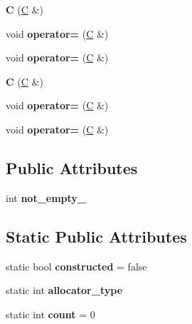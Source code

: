 \begin{DoxyCompactItemize}
\item 
\mbox{\label{struct_c_af685fe0d514aa5b57dd12b2038ce825e}} 
{\bfseries C} (\mbox{\hyperlink{struct_c}{C}} \&)
\item 
\mbox{\label{struct_c_a0e102e04676b8089288d6a09e93932fc}} 
void {\bfseries operator=} (\mbox{\hyperlink{struct_c}{C}} \&)
\item 
\mbox{\label{struct_c_a0e102e04676b8089288d6a09e93932fc}} 
void {\bfseries operator=} (\mbox{\hyperlink{struct_c}{C}} \&)
\item 
\mbox{\label{struct_c_af685fe0d514aa5b57dd12b2038ce825e}} 
{\bfseries C} (\mbox{\hyperlink{struct_c}{C}} \&)
\item 
\mbox{\label{struct_c_a0e102e04676b8089288d6a09e93932fc}} 
void {\bfseries operator=} (\mbox{\hyperlink{struct_c}{C}} \&)
\item 
\mbox{\label{struct_c_a0e102e04676b8089288d6a09e93932fc}} 
void {\bfseries operator=} (\mbox{\hyperlink{struct_c}{C}} \&)
\end{DoxyCompactItemize}
\subsection*{Public Attributes}
\begin{DoxyCompactItemize}
\item 
\mbox{\label{struct_c_aa9e10df72ec42809314914d1b36148d1}} 
int {\bfseries not\+\_\+empty\+\_\+}
\end{DoxyCompactItemize}
\subsection*{Static Public Attributes}
\begin{DoxyCompactItemize}
\item 
\mbox{\label{struct_c_ae24a85e80c8d4f012ae777c94d106771}} 
static bool {\bfseries constructed} = false
\item 
\mbox{\label{struct_c_abd66c8ffc4422d41fd6e9a6a946dd731}} 
static int {\bfseries allocator\+\_\+type}
\item 
\mbox{\label{struct_c_af0f0383e59c90ebec0036255de1ddc67}} 
static int {\bfseries count} = 0
\end{DoxyCompactItemize}

